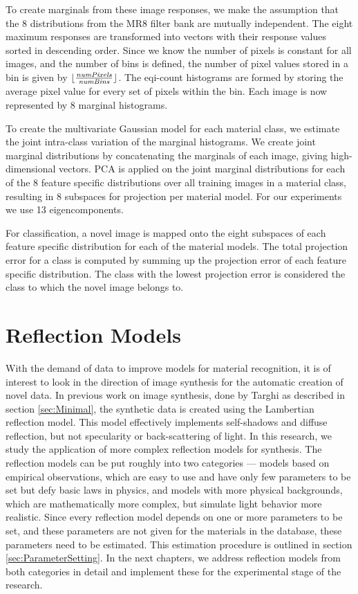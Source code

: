 To create marginals from these image responses, we make the assumption that the 8 distributions from the MR8 filter bank are mutually independent. The eight maximum responses are transformed into vectors with their response values sorted in descending order. Since we know the number of pixels is constant for all images, and the number of bins is defined, the number of pixel values stored in a bin is given by $\lfloor \frac{{\it numPixels}}{{\it numBins}} \rfloor$. The eqi-count histograms are formed by storing the average pixel value for every set of pixels within the bin. Each image is now represented by 8 marginal histograms.

To create the multivariate Gaussian model for each material class, we estimate the joint intra-class variation of the marginal histograms. We create joint marginal distributions by concatenating the marginals of each image, giving high-dimensional vectors. PCA is applied on the joint marginal distributions for each of the 8 feature specific distributions over all training images in a material class, resulting in 8 subspaces for projection per material model. For our experiments we use 13 eigencomponents.

For classification, a novel image is mapped onto the eight subspaces of each feature specific distribution for each of the material models. The total projection error for a class is computed by summing up the projection error of each feature specific distribution. The class with the lowest projection error is considered the class to which the novel image belongs to. 

\section{Reflection Models}\label{sec:ReflectionModels}
With the demand of data to improve models for material recognition, it is of interest to look in the direction of image synthesis for the automatic creation of novel data. In previous work on image synthesis, done by Targhi as described in section \ref{sec:Minimal}, the synthetic data is created using the Lambertian reflection model. This model effectively implements self-shadows and diffuse reflection, but not specularity or back-scattering of light. In this research, we study the application of more complex reflection models for synthesis. The reflection models can be put roughly into two categories --- models based on empirical observations, which are easy to use and have only few parameters to be set but defy basic laws in physics, and models with more physical backgrounds, which are mathematically more complex, but simulate light behavior more realistic. Since every reflection model depends on one or more parameters to be set, and these parameters are not given for the materials in the database, these parameters need to be estimated. This estimation procedure is outlined in section \ref{sec:ParameterSetting}. In the next chapters, we address reflection models from both categories in detail and implement these for the experimental stage of the research.



